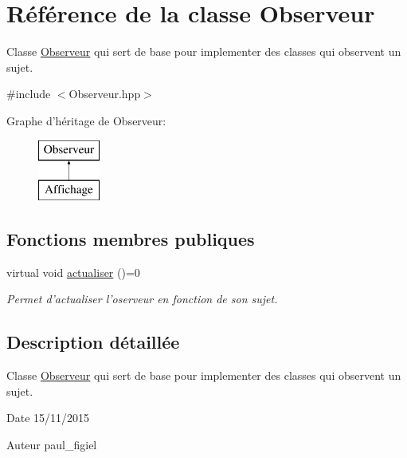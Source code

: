 \hypertarget{class_observeur}{\section{Référence de la classe Observeur}
\label{class_observeur}
}


Classe \hyperlink{class_observeur}{Observeur} qui sert de base pour implementer des classes qui observent un sujet.  




{\ttfamily \#include $<$Observeur.\-hpp$>$}

Graphe d'héritage de Observeur\-:\begin{figure}[H]
\begin{center}
\leavevmode
\includegraphics[height=2.000000cm]{class_observeur}
\end{center}
\end{figure}
\subsection*{Fonctions membres publiques}
\begin{DoxyCompactItemize}
\item 
virtual void \hyperlink{class_observeur_ad3f81ed71b0b056e7c20b731211c5958}{actualiser} ()=0
\begin{DoxyCompactList}\small\item\em Permet d'actualiser l'oserveur en fonction de son sujet. \end{DoxyCompactList}\end{DoxyCompactItemize}


\subsection{Description détaillée}
Classe \hyperlink{class_observeur}{Observeur} qui sert de base pour implementer des classes qui observent un sujet. 

\begin{DoxyDate}{Date}
15/11/2015 
\end{DoxyDate}
\begin{DoxyAuthor}{Auteur}
paul\-\_\-figiel 
\end{DoxyAuthor}


